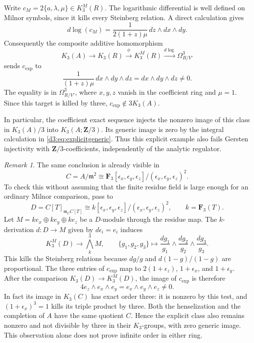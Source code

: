 \documentclass[11pt,a4paper]{amsart}
\numberwithin{equation}{section}
\theoremstyle{definition}
\theoremstyle{remark}
\newtheorem{remark}[theorem]{Remark}
\newcommand{\Z}{\mathbf Z}
\newcommand{\F}{\mathbf F}
\newcommand{\m}{\mathfrak m}
\begin{document}
Write $c_M=2\{a,\lambda,\mu\}\in K^M_3(R)$. The logarithmic differential is well defined on Milnor symbols, since it kills every Steinberg relation. A direct calculation gives
\[
d\log(c_M)
=\frac{1}{2(1+z)\mu}\,dz\wedge dx\wedge dy.
\]
Consequently the composite additive homomorphism
\[
K_3(A)\longrightarrow K_3(R)
\xrightarrow{\phi}K^M_3(R)
\xrightarrow{d\log}\Omega^3_{R/V'}
\]
sends $c_{\mathrm{exp}}$ to
\[
\frac{1}{(1+z)\mu}\,dx\wedge dy\wedge dz
=dx\wedge dy\wedge dz\neq0.
\]
The equality is in $\Omega^3_{R/V'}$, where $x,y,z$ vanish in the coefficient ring and $\mu=1$. Since this target is killed by three, $c_{\mathrm{exp}}\notin3K_3(A)$.

In particular, the coefficient exact sequence injects the nonzero image of this class in $K_3(A)/3$ into $K_3(A;\Z/3)$. Its generic image is zero by the integral calculation in \eqref{d3:eq:explicitgeneric}. Thus this explicit example also fails Gersten injectivity with $\Z/3$-coefficients, independently of the analytic regulator.

\begin{remark}
The same conclusion is already visible in
\[
C=A/\m^2\cong
\F_3[\epsilon_x,\epsilon_y,\epsilon_z]/(\epsilon_x,\epsilon_y,\epsilon_z)^2.
\]
To check this without assuming that the finite residue field is large enough for an ordinary Milnor comparison, pass to
\[
D=C[T]_{\m_C C[T]}
\cong k[\epsilon_x,\epsilon_y,\epsilon_z]/(\epsilon_x,\epsilon_y,\epsilon_z)^2,
\qquad k=\F_3(T).
\]
Let $M=k e_x\oplus k e_y\oplus k e_z$ be a $D$-module through the residue map. The $k$-derivation $d:D\to M$ given by $d\epsilon_i=e_i$ induces
\[
K_3^M(D)\longrightarrow\bigwedge_k^3 M,\qquad
\{g_1,g_2,g_3\}\longmapsto
\frac{dg_1}{g_1}\wedge\frac{dg_2}{g_2}\wedge\frac{dg_3}{g_3}.
\]
This kills the Steinberg relations because $dg/g$ and $d(1-g)/(1-g)$ are proportional. The three entries of $c_{\mathrm{exp}}$ map to $2(1+\epsilon_z)$, $1+\epsilon_x$, and $1+\epsilon_y$. After the comparison $K_3(D)\to K_3^M(D)$, the image of $c_{\mathrm{exp}}$ is therefore
\[
4e_z\wedge e_x\wedge e_y=e_x\wedge e_y\wedge e_z\ne0.
\]
In fact its image in $K_3(C)$ has exact order three: it is nonzero by this test, and $(1+\epsilon_x)^3=1$ kills its triple product by three. Both the henselization and the completion of $A$ have the same quotient $C$. Hence the explicit class also remains nonzero and not divisible by three in their $K_3$-groups, with zero generic image. This observation alone does not prove infinite order in either ring.
\end{remark}
\end{document}
